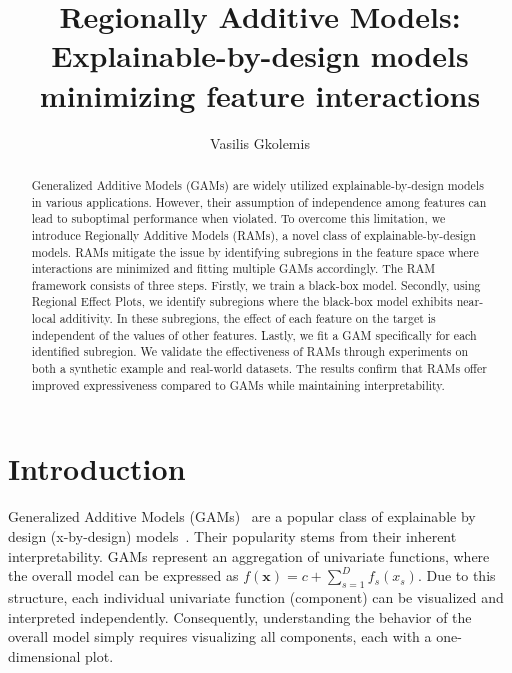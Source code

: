 \documentclass[12pt]{article}
\title{Regionally Additive Models: Explainable-by-design models minimizing feature interactions}
\author{Vasilis Gkolemis}
\newcommand{\xb}{\mathbf{x}}
\begin{document}
    \def\MakeUppercaseUnsupportedInPdfStrings{\scshape}
\maketitle

\begin{abstract}
Generalized Additive Models (GAMs) are widely utilized explainable-by-design models in various applications.
However, their assumption of independence among features can lead to suboptimal performance when violated.
To overcome this limitation, we introduce Regionally Additive Models (RAMs), a novel class of explainable-by-design models.
RAMs mitigate the issue by identifying subregions in the feature space where interactions are minimized and fitting multiple GAMs accordingly.
The RAM framework consists of three steps.
Firstly, we train a black-box model.
Secondly, using Regional Effect Plots, we identify subregions where the black-box model exhibits near-local additivity.
In these subregions, the effect of each feature on the target is independent of the values of other features.
Lastly, we fit a GAM specifically for each identified subregion.
We validate the effectiveness of RAMs through experiments on both a synthetic example and real-world datasets.
The results confirm that RAMs offer improved expressiveness compared to GAMs while maintaining interpretability.
\end{abstract}

\section{Introduction}

Generalized Additive Models (GAMs)~\citep{hastie1987generalized} are a popular class of explainable by design
(x-by-design) models~\citep{rudin2019stop, ghassemi2021false}.
Their popularity stems from their inherent interpretability.
GAMs represent an aggregation of univariate functions, where the overall model can be expressed as
\(f(\xb) = c + \sum_{s=1}^D f_s(x_s)\).
Due to this structure, each individual univariate function (component) can be visualized and interpreted independently.
Consequently, understanding the behavior of the overall model simply requires visualizing all components, each with a one-dimensional plot.
\end{document}
